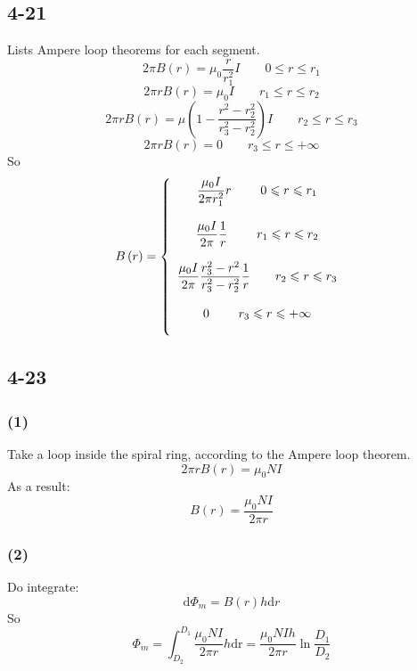 \documentclass[a4paper,11pt]{amsart}
\theoremstyle{definition}
\begin{document}
	\subsection*{4-21}
	Lists Ampere loop theorems for each segment.
	$$
	2\pi B(r)=\mu_0\dfrac{r}{r_1^2}I\qquad0\leqslant r\leqslant r_1
	$$	
	$$
	2\pi rB\left( r \right) =\mu _0I\qquad r_1\leqslant r\leqslant r_2
	$$
	$$
	2\pi rB\left( r \right) =\mu \left( 1-\frac{r^2-r_{2}^{2}}{r_{3}^{2}-r_{2}^{2}} \right) I\qquad r_2\leqslant r\leqslant r_3
	$$
	$$
	2\pi rB\left( r \right) =0\qquad r_3\leqslant r\leqslant +\infty 
	$$
	So
	$$
	B\left( r \right) =\left\{ \begin{array}{c}
		\dfrac{\mu _0I}{2\pi r_{1}^{2}}r\qquad \,\,        0\leqslant r\leqslant r_1\\\\
		\dfrac{\mu _0I}{2\pi}\dfrac{1}{r}\qquad \,\,         r_1\leqslant r\leqslant r_2\\\\
		\dfrac{\mu _0I}{2\pi}\dfrac{r_{3}^{2}-r^2}{r_{3}^{2}-r_{2}^{2}}\dfrac{1}{r}\qquad r_2\leqslant r\leqslant r_3\\\\
		0\qquad \,\,                    r_3\leqslant r\leqslant +\infty\\\\
	\end{array} \right. 
	\\	
	$$
	\subsection*{4-23}
	\subsubsection*{(1)}
	Take a loop inside the spiral ring, according to the Ampere loop theorem.
	$$
	2\pi rB\left( r \right) =\mu _0NI
	$$
	As a result:
	$$
	B\left( r \right) =\frac{\mu _0NI}{2\pi r}
	$$
	\subsubsection*{(2)}
	Do integrate:
	$$
	\mathrm{d}\varPhi _m=B\left( r \right) h\mathrm{d}r
	$$
	So
	$$
	\varPhi _m=\int_{D_2}^{D_1}{\frac{\mu _0NI}{2\pi r}h\mathrm{dr}}=\frac{\mu _0NIh}{2\pi r}\ln \frac{D_1}{D_2}
	$$
\end{document}
